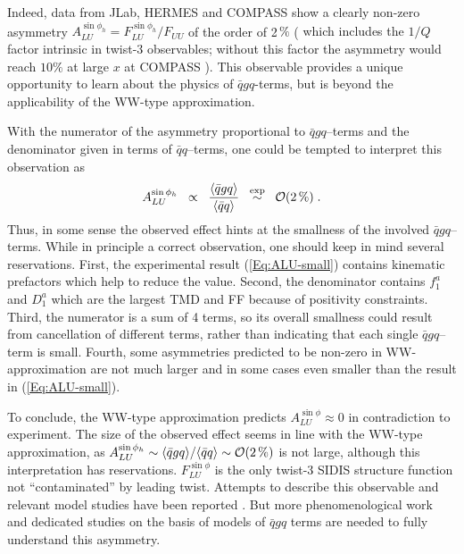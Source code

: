 \documentclass[a4paper,11pt]{article}
\newcommand{\blue}[1]{{\color{blue} #1}}
\newcommand{\be}{\begin{equation}}
\newcommand{\ee}{\end{equation}}
\newcommand{\la}{\langle}
\newcommand{\ra}{\rangle}
\newcommand{\ps}[1]{\blue{#1}}
\begin{document}
Indeed, data from JLab, HERMES and COMPASS show a clearly non-zero
asymmetry $A_{LU}^{\sin\phi_h} = F_{LU}^{\sin\phi_h}/F_{UU}$ of the order of 2\,$\%$
\cite{Avakian:2003pk,Airapetian:2006rx,Gohn:2009zz,
Aghasyan:2011ha,Adolph:2014pwc,Gohn:2014zbz} (\ps{which includes
the $1/Q$ factor intrinsic in twist-3 observables; without this factor
the asymmetry would} reach $10\%$ at large $x$ at COMPASS \cite{private}).
This observable provides a unique opportunity to learn about the
physics of $\bar{q}gq$-terms, but is beyond the applicability of
the WW-type approximation.

With the numerator of the asymmetry proportional to $\bar{q}gq$--terms
and the denominator given in terms of $\bar{q} q$--terms, one could be
tempted to interpret this observation as
\be\label{Eq:ALU-small}
    	A_{LU}^{\sin\phi_h}
	\;\; \propto \;\;\frac{\la\bar{q}gq\ra}{\la\bar{q}q\ra}
    	\;\;\stackrel{\rm exp}{\sim} \;\;
	{\cal O}(2\,\%)
    	\;.
\ee
Thus, in some sense the observed effect hints at the smallness of the
involved $\bar{q}gq$--terms. While in principle a correct observation,
one should keep in mind several reservations. First,
the experimental result (\ref{Eq:ALU-small})
contains kinematic prefactors which help to reduce the value.
Second, the denominator contains $f_1^a$ and $D_1^a$ which are the
largest TMD and FF because of positivity constraints. Third, the
numerator is a sum of 4 terms, so its overall smallness could result
from cancellation of different terms, rather than indicating that
each single $\bar{q}gq$--term is small. Fourth, some asymmetries
predicted to be non-zero in WW-approximation are not much larger and
in some cases even smaller than the result in (\ref{Eq:ALU-small}).

To conclude, the WW-type approximation predicts $A_{LU}^{\sin\phi}\approx 0$
in contradiction to experiment. The size of the observed effect seems
in line with the WW-type approximation, as
$A_{LU}^{\sin\phi_h}\sim\la\bar{q}gq\ra/\la\bar{q}q\ra \sim {\cal O}(2\,\%)$
is not large, although this interpretation has reservations.
$F_{LU}^{\sin\phi}$ is the only twist-3 SIDIS structure function not
``contaminated'' by leading twist. Attempts to describe this observable
and relevant model studies have been reported
\cite{Efremov:2002qh,Schweitzer:2003uy,Ohnishi:2003mf,Cebulla:2007ej,
Efremov:2002ut,Afanasev:2003ze,Yuan:2003gu,Gamberg:2003pz,Metz:2004je,Afanasev:2006gw,Mao:2012dk,Mao:2013waa,Mao:2014dva,Lorce:2014hxa,Courtoy:2014ixa,Yang:2016mxl}.
But more phenomenological work and dedicated studies on the basis of models
of $\bar{q}gq$ terms are needed to fully understand this asymmetry.
\end{document}
